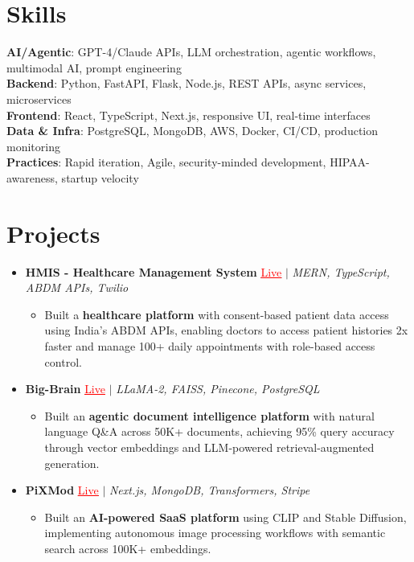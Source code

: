 \documentclass[letterpaper,10pt]{article}
\newcommand{\resumeItem}[1]{\item\small{{#1 \vspace{-2pt}}}}
\newcommand{\resumeProjectHeading}[1]{\item \small #1 \vspace{-2pt}}
\newcommand{\resumeSubHeadingListStart}{\begin{itemize}[leftmargin=0.0in, label={}]}
\newcommand{\resumeSubHeadingListEnd}{\end{itemize}}
\newcommand{\resumeProjItemListStart}{\begin{itemize}[leftmargin=0.15in,label=\textbullet,itemsep=0pt,topsep=0pt,parsep=0pt,partopsep=0pt]}
\newcommand{\resumeProjItemListEnd}{\end{itemize}\vspace{-4pt}}
\begin{document}
\section{Skills}
\begin{itemize}[leftmargin=0.15in, label={}]
\small{\item{
\textbf{AI/Agentic}: GPT-4/Claude APIs, LLM orchestration, agentic workflows, multimodal AI, prompt engineering \\
\textbf{Backend}: Python, FastAPI, Flask, Node.js, REST APIs, async services, microservices \\
\textbf{Frontend}: React, TypeScript, Next.js, responsive UI, real-time interfaces \\
\textbf{Data \& Infra}: PostgreSQL, MongoDB, AWS, Docker, CI/CD, production monitoring \\
\textbf{Practices}: Rapid iteration, Agile, security-minded development, HIPAA-awareness, startup velocity
}}
\end{itemize}
\vspace{-16pt}
\section{Projects}
\resumeSubHeadingListStart
\vspace{-2pt}
\resumeProjectHeading{\textbf{HMIS - Healthcare Management System} {\href{https://hims-rouge.vercel.app/}{\textcolor{red}{\underline{Live}}}} $|$ \emph{MERN, TypeScript, ABDM APIs, Twilio}}
\resumeProjItemListStart
\resumeItem{Built a \textbf{healthcare platform} with consent-based patient data access using India's ABDM APIs, enabling doctors to access patient histories 2x faster and manage 100+ daily appointments with role-based access control.}
\resumeProjItemListEnd
\vspace{3pt}
\resumeProjectHeading{\textbf{Big-Brain} {\href{https://big-brain-pied.vercel.app/}{\textcolor{red}{\underline{Live}}}} $|$ \emph{LLaMA-2, FAISS, Pinecone, PostgreSQL}}
\resumeProjItemListStart
\resumeItem{Built an \textbf{agentic document intelligence platform} with natural language Q\&A across 50K+ documents, achieving 95\% query accuracy through vector embeddings and LLM-powered retrieval-augmented generation.}
\resumeProjItemListEnd
\vspace{3pt}
\resumeProjectHeading{\textbf{PiXMod} {\href{https://pixmod.vercel.app/}{\textcolor{red}{\underline{Live}}}} $|$ \emph{Next.js, MongoDB, Transformers, Stripe}}
\resumeProjItemListStart
\resumeItem{Built an \textbf{AI-powered SaaS platform} using CLIP and Stable Diffusion, implementing autonomous image processing workflows with semantic search across 100K+ embeddings.}
\resumeProjItemListEnd
\resumeSubHeadingListEnd
\end{document}
